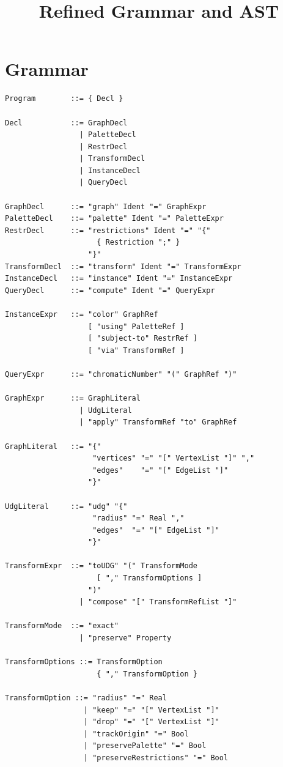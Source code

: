 \documentclass[11pt]{article}
\title{Refined Grammar and AST}
\author{}
\date{}
\begin{document}
\maketitle

\section*{Grammar}

\begin{lstlisting}[style=plain]
Program        ::= { Decl }

Decl           ::= GraphDecl
                 | PaletteDecl
                 | RestrDecl
                 | TransformDecl
                 | InstanceDecl
                 | QueryDecl

GraphDecl      ::= "graph" Ident "=" GraphExpr
PaletteDecl    ::= "palette" Ident "=" PaletteExpr
RestrDecl      ::= "restrictions" Ident "=" "{"
                     { Restriction ";" }
                   "}"
TransformDecl  ::= "transform" Ident "=" TransformExpr
InstanceDecl   ::= "instance" Ident "=" InstanceExpr
QueryDecl      ::= "compute" Ident "=" QueryExpr

InstanceExpr   ::= "color" GraphRef
                   [ "using" PaletteRef ]
                   [ "subject-to" RestrRef ]
                   [ "via" TransformRef ]

QueryExpr      ::= "chromaticNumber" "(" GraphRef ")"

GraphExpr      ::= GraphLiteral
                 | UdgLiteral
                 | "apply" TransformRef "to" GraphRef

GraphLiteral   ::= "{"
                    "vertices" "=" "[" VertexList "]" ","
                    "edges"    "=" "[" EdgeList "]"
                   "}"

UdgLiteral     ::= "udg" "{"
                    "radius" "=" Real ","
                    "edges"  "=" "[" EdgeList "]"
                   "}"

TransformExpr  ::= "toUDG" "(" TransformMode
                     [ "," TransformOptions ]
                   ")"
                 | "compose" "[" TransformRefList "]"

TransformMode  ::= "exact"
                 | "preserve" Property

TransformOptions ::= TransformOption
                     { "," TransformOption }

TransformOption ::= "radius" "=" Real
                  | "keep" "=" "[" VertexList "]"
                  | "drop" "=" "[" VertexList "]"
                  | "trackOrigin" "=" Bool
                  | "preservePalette" "=" Bool
                  | "preserveRestrictions" "=" Bool


\end{lstlisting}
\end{document}
